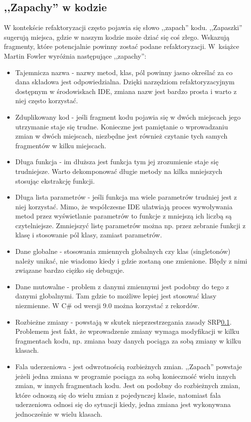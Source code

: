 \subsection{,,Zapachy'' w kodzie}
W kontekście refaktoryzacji często pojawia się słowo ,,zapach'' kodu. ,,Zapaszki'' sugerują miejsca, gdzie w naszym kodzie może dziać się coś złego. Wskazują fragmenty, które potencjalnie powinny zostać podane refaktoryzacji. W~książce Martin Fowler wyróżnia następujące ,,zapachy'':
\begin{itemize}
	\item Tajemnicza nazwa - nazwy metod, klas, pól powinny jasno określać za co dana składowa jest odpowiedzialna. Dzięki narzędziom refaktoryzacyjnym dostępnym w środowiskach IDE, zmiana nazw jest bardzo prosta i warto z niej często korzystać.
	\item Zduplikowany kod - jeśli fragment kodu pojawia się w dwóch miejscach jego utrzymanie staje się trudne. Konieczne jest pamiętanie o wprowadzaniu zmian w dwóch miejscach, niezbędne jest również czytanie tych samych fragmentów w kilku miejscach.
	\item Długa funkcja - im dłuższa jest funkcja tym jej zrozumienie staje się trudniejsze. Warto dekomponować długie metody na kilka mniejszych stosując ekstrakcję funkcji.
	\item Długa lista parametrów - jeśli funkcja ma wiele parametrów trudniej jest z niej korzystać. Mimo, że współczesne IDE ułatwiają proces wywoływania metod przez wyświetlanie parametrów to funkcje z mniejszą ich liczbą są czytelniejsze. Zmniejszyć listę parametrów można np. przez zebranie funkcji z klasę i stosowanie pól klasy, zamiast parametrów. 
	\item Dane globalne - stosowania zmiennych globalnych czy klas (singletonów) należy unikać, nie wiadomo kiedy i gdzie zostaną one zmienione. Błędy z nimi związane bardzo ciężko się debuguje. 
	\item Dane mutowalne - problem z danymi zmiennymi jest podobny do tego z danymi globalnymi. Tam gdzie to możliwe lepiej jest stosować klasy niezmienne. W C\# od wersji 9.0 można korzystać z rekordów.
	\item Rozbieżne zmiany - powstają w skutek nieprzestrzegania zasady SRP\ref{}. Problemem jest fakt, że wprowadzenie zmiany wymaga modyfikacji w kilku fragmentach kodu, np. zmiana bazy danych pociąga za sobą zmiany w kilku klasach.
	\item Fala uderzeniowa - jest odwrotnością rozbieżnych zmian. ,,Zapach'' powstaje jeżeli jedna zmiana w programie pociąga za sobą konieczność wielu innych zmian, w innych fragmentach kodu. Jest on podobny do rozbieżnych zmian, które odnoszą się do wielu zmian z pojedynczej klasie, natomiast fala uderzeniowa odnosi się do sytuacji kiedy, jedna zmiana jest wykonywana jednocześnie w wielu klasach. 

\end{itemize}
